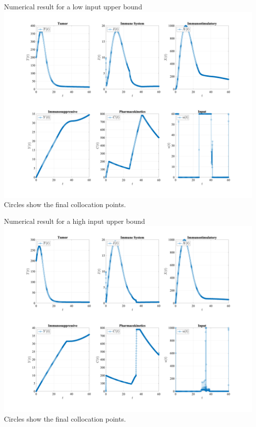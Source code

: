 \documentclass[10pt]{beamer}
\begin{document}
\begin{frame}{Numerical result for a low input upper bound}
	\includegraphics[width=1\linewidth]{chemo-optimalcontrol1.png} \\
	Circles show the final collocation points.
\end{frame}

\begin{frame}{Numerical result for a high input upper bound}
	\includegraphics[width=1\linewidth]{chemo-optimalcontrol2.png} \\
	Circles show the final collocation points.
\end{frame}
\end{document}
